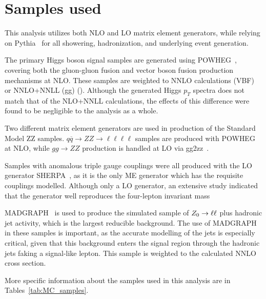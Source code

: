 \section{Samples used}
This analysis utilizes both NLO and LO matrix element generators, while relying
on Pythia~\cite{PYTHIA} for all showering, hadronization, and underlying event
generation.

The primary Higgs boson signal samples are generated using POWHEG~\cite{POWHEG},
covering both the gluon-gluon fusion and vector boson fusion production
mechanisms at NLO. These samples are weighted to NNLO calculations (VBF) or
NNLO+NNLL (gg) (\cite{yellowReport}). Although the generated Higgs $p_T$ spectra
does not match that of the NLO+NNLL calculations, the effects of this difference
were found to be negligible to the analysis as a whole.

Two different matrix element generators are used in production of the Standard
Model ZZ samples. $q\overline q \rightarrow ZZ \rightarrow \ell\ell\ell\ell$
samples are produced with POWHEG at NLO, while $gg\rightarrow ZZ$ production is
handled at LO via gg2zz~\cite{gg2zz}.

Samples with anomalous triple gauge couplings were all produced with
the LO generator SHERPA~\cite{SHERPA}, as it is the only ME generator which has
the requisite couplings modelled. Although only a LO generator, an extensive
study indicated that the generator well reproduces the four-lepton invariant
mass 

MADGRAPH~\cite{MADGRAPH} is used to produce the simulated sample of
${Z}_0\rightarrow \ell\ell$ plus hadronic jet activity, which is the largest
reducible background. The use of MADGRAPH in these samples is important, as the
accurate modelling of the jets is especially critical, given that this
background enters the signal region through the hadronic jets faking a
signal-like lepton. This sample is weighted to the calculated NNLO cross
section.

More specific information about the samples used in this analysis are in
Tables~\ref{tab:MC_samples}.

